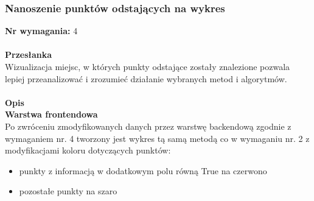 \documentclass[eng,printmode]{mgr}
\begin{document}
\subsubsection{Nanoszenie punktów odstających na wykres}
\textbf{Nr wymagania:} 4
\\\\
\textbf{Przesłanka}\\
Wizualizacja miejsc, w których punkty odstające zostały znalezione pozwala lepiej przeanalizować i zrozumieć działanie wybranych metod i algorytmów.
\\\\
\textbf{Opis}\\
\textbf{Warstwa frontendowa}\\
Po zwróceniu zmodyfikowanych danych przez warstwę backendową zgodnie z wymaganiem nr. 4 tworzony jest wykres tą samą metodą co w wymaganiu nr. 2 z modyfikacjami koloru dotyczących punktów:
\begin{itemize}
  \item punkty z informacją w dodatkowym polu równą True na czerwono
  \item pozostałe punkty na szaro
\end{itemize}
\end{document}
